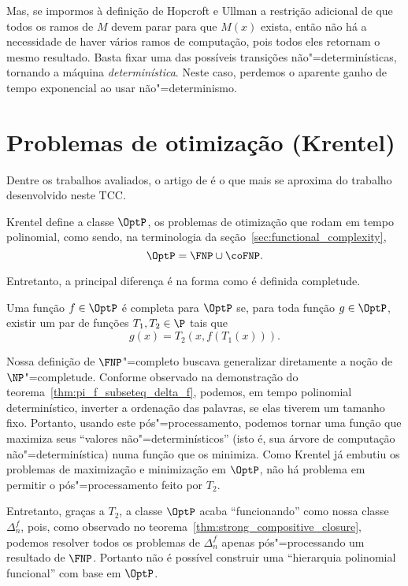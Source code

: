 Mas,
se impormos à definição de Hopcroft e Ullman a restrição adicional
de que todos os ramos de $M$ devem parar para que $M(x)$ exista,
então não há a necessidade de haver vários ramos de computação,
pois todos eles retornam o mesmo resultado.
Basta fixar uma das possíveis transições não"=determinísticas,
tornando a máquina \emph{determinística}.
Neste caso,
perdemos o aparente ganho de tempo exponencial ao usar não"=determinismo.

\section{Problemas de otimização (Krentel)}

Dentre os trabalhos avaliados,
o artigo de 
é o que mais se aproxima do trabalho desenvolvido neste TCC.

Krentel define a classe $\OptP$,
os problemas de otimização que rodam em tempo polinomial,
como sendo,
na terminologia da seção~\ref{sec:functional_complexity},
\begin{equation*}
    \OptP = \FNP \cup \coFNP.
\end{equation*}

Entretanto,
a principal diferença é na forma como é definida completude.
\begin{definition}
    Uma função $f \in \OptP$ é completa para $\OptP$
    se, para toda função $g \in \OptP$,
    existir um par de funções $T_1, T_2 \in \P$
    tais que
    \begin{equation*}
        g(x) = T_2( x, f(T_1(x)) ).
    \end{equation*}
\end{definition}

Nossa definição de $\FNP$"=completo
buscava generalizar diretamente a noção de $\NP$"=completude.
Conforme observado na demonstração do teorema~\ref{thm:pi_f_subseteq_delta_f},
podemos, em tempo polinomial determinístico,
inverter a ordenação das palavras, se elas tiverem um tamanho fixo.
Portanto,
usando este pós"=processamento,
podemos tornar uma função que maximiza seus ``valores não"=determinísticos''
(isto é, sua árvore de computação não"=determinística)
numa função que os minimiza.
Como Krentel já embutiu os problemas de maximização e minimização em $\OptP$,
não há problema em permitir o pós"=processamento feito por $T_2$.

Entretanto,
graças a $T_2$,
a classe $\OptP$ acaba ``funcionando'' como nossa classe $\Delta_n^f$,
pois,
como observado no teorema~\ref{thm:strong_compositive_closure},
podemos resolver todos os problemas de $\Delta_n^f$
apenas pós"=processando um resultado de $\FNP$.
Portanto não é possível construir uma ``hierarquia polinomial funcional''
com base em $\OptP$.
